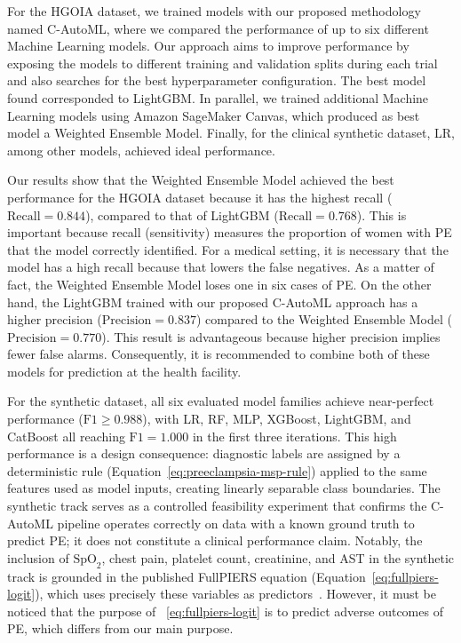 \documentclass[diagnostics,article,accept,pdftex,moreauthors]{Definitions/mdpi}
\begin{document}
For the \ac{HGOIA} dataset, we trained models with our
proposed methodology named \ac{C-AutoML}, where we compared the
performance of up to six different Machine Learning models. Our approach
aims to improve performance by exposing the models to different
training and validation splits during each trial and also searches
for the best hyperparameter configuration. The best model found corresponded
to LightGBM. In parallel, we trained additional
Machine Learning models using Amazon SageMaker Canvas, which produced as
best model a Weighted Ensemble Model. Finally, for the
clinical synthetic dataset, \ac{LR}, among other models, achieved
ideal performance.

Our results show that the Weighted Ensemble Model achieved
the best performance for the \ac{HGOIA} dataset because it
has the highest recall ($\mathrm{Recall}=0.844$), compared to that of
LightGBM ($\mathrm{Recall}=0.768$). This is important
because recall (sensitivity) measures the proportion of women with
\ac{PE} that the model correctly identified. For a medical setting, it is necessary that the model has a
high recall because that lowers the false negatives. As a matter of
fact, the Weighted Ensemble Model loses one in six cases of
\ac{PE}. On the other hand, the LightGBM trained with
our proposed \ac{C-AutoML} approach has a higher precision
($\mathrm{Precision}=0.837$) compared to the Weighted Ensemble
  Model ($\mathrm{Precision}=0.770$). This result is advantageous
because higher precision implies fewer false alarms. Consequently, it is
recommended to combine both of these models for prediction at the
health facility.

For the synthetic dataset, all six evaluated model
  families achieve near-perfect performance ($\mathrm{F1}\geq 0.988$),
  with \ac{LR}, \ac{RF}, \ac{MLP}, XGBoost, LightGBM, and CatBoost all
  reaching $\mathrm{F1}=1.000$ in the first three iterations. This
  high performance is a design consequence: diagnostic labels are
  assigned by a deterministic rule
  (Equation~\eqref{eq:preeclampsia-msp-rule}) applied to the same
  features used as model inputs, creating linearly separable class
  boundaries. The synthetic track serves as a controlled feasibility
  experiment that confirms the \ac{C-AutoML} pipeline operates
  correctly on data with a known ground truth to predict \ac{PE}; it
  does not constitute a clinical performance claim. Notably, the
  inclusion {of} $\text{SpO}_2$, %
  chest pain, platelet count, creatinine, and \ac{AST} in the
  synthetic track is grounded in the published FullPIERS equation
  (Equation~\eqref{eq:fullpiers-logit}), which uses precisely these
  variables as predictors~\cite{fullpiers_2011}. However, it must be
  noticed that the purpose of ~\eqref{eq:fullpiers-logit} is to
  predict adverse outcomes of \ac{PE}, which differs from our main
  purpose.
\end{document}
